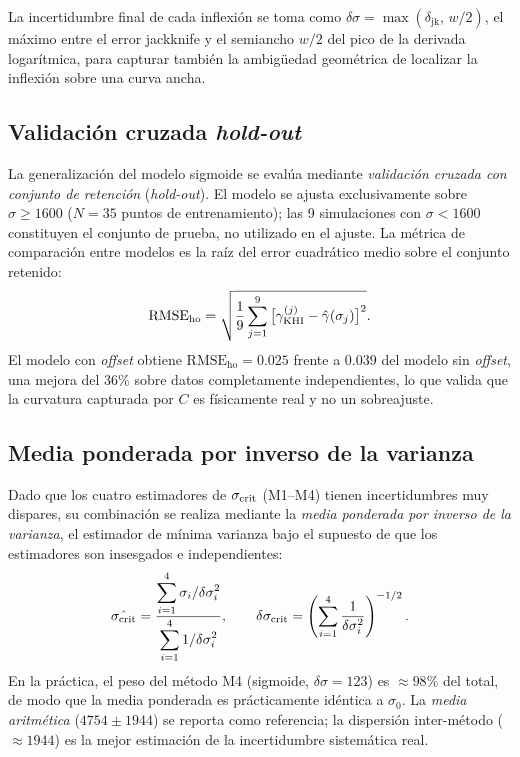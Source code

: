 \primerparrafo La incertidumbre final de cada inflexión se toma como $\delta\sigma = \max(\delta_{\mathrm{jk}},\,w/2)$, el máximo entre el error jackknife y el semiancho $w/2$ del pico de la derivada logarítmica, para capturar también la ambigüedad geométrica de localizar la inflexión sobre una curva ancha.

\subsection{Validación cruzada \emph{hold-out}}
\label{ap:est:holdout}

\primerparrafo La generalización del modelo sigmoide se evalúa mediante \emph{validación cruzada con conjunto de retención} (\emph{hold-out}). El modelo se ajusta exclusivamente sobre $\sigma\ge1600$ ($N=35$ puntos de entrenamiento); las 9 simulaciones con $\sigma<1600$ constituyen el conjunto de prueba, no utilizado en el ajuste. La métrica de comparación entre modelos es la raíz del error cuadrático medio sobre el conjunto retenido:
\begin{equation}
    \mathrm{RMSE}_{\mathrm{ho}} = \sqrt{\frac{1}{9}\sum_{j=1}^{9}\big[\gamma_{\mathrm{KHI}}^{(j)} - \hat\gamma(\sigma_j)\big]^2}.
\end{equation}
El modelo con \emph{offset} obtiene $\mathrm{RMSE}_{\mathrm{ho}}=0.025$ frente a $0.039$ del modelo sin \emph{offset}, una mejora del $36\%$ sobre datos completamente independientes, lo que valida que la curvatura capturada por $C$ es físicamente real y no un sobreajuste.

\subsection{Media ponderada por inverso de la varianza}
\label{ap:est:ponderada}

\primerparrafo Dado que los cuatro estimadores de $\sigma_{\mathrm{crit}}$ (M1--M4) tienen incertidumbres muy dispares, su combinación se realiza mediante la \emph{media ponderada por inverso de la varianza}, el estimador de mínima varianza bajo el supuesto de que los estimadores son insesgados e independientes:
\begin{equation}
    \hat{\sigma_{\mathrm{crit}}} = \frac{\displaystyle\sum_{i=1}^{4} \sigma_i / \delta\sigma_i^2}
                      {\displaystyle\sum_{i=1}^{4} 1/\delta\sigma_i^2},
    \qquad
    \delta\sigma_{\mathrm{crit}} = \left(\sum_{i=1}^{4} \frac{1}{\delta\sigma_i^2}\right)^{-1/2}.
\end{equation}
En la práctica, el peso del método M4 (sigmoide, $\delta\sigma=123$) es $\approx98\%$ del total, de modo que la media ponderada es prácticamente idéntica a $\sigma_0$. La \emph{media aritmética} ($4754\pm1944$) se reporta como referencia; la dispersión inter-método ($\approx1944$) es la mejor estimación de la incertidumbre sistemática real.

